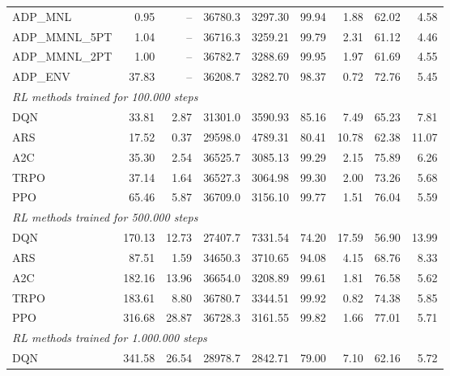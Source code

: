\begin{samepage}
\begin{center}
\begin{tabular}{l|rr|rr|rr|rr}
    \midrule
    ADP\_MNL     &     0.95 &    -- &    36780.3 &    3297.30 &   99.94 &    1.88 &   62.02 &    4.58 \\
    ADP\_MMNL\_5PT &     1.04 &    -- &    36716.3 &    3259.21 &   99.79 &    2.31 &   61.12 &    4.46 \\
    ADP\_MMNL\_2PT &     1.00 &    -- &    36782.7 &    3288.69 &   99.95 &    1.97 &   61.69 &    4.55 \\
    ADP\_ENV     &    37.83 &    -- &    36208.7 &    3282.70 &   98.37 &    0.72 &   72.76 &    5.45 \\
    \midrule
    \multicolumn{9}{l}{\textit{RL methods trained for 100.000 steps}} \\
    \midrule
    DQN          &    33.81 &     2.87 &    31301.0 &    3590.93 &   85.16 &    7.49 &   65.23 &    7.81 \\
    ARS          &    17.52 &     0.37 &    29598.0 &    4789.31 &   80.41 &   10.78 &   62.38 &   11.07 \\
    A2C          &    35.30 &     2.54 &    36525.7 &    3085.13 &   99.29 &    2.15 &   75.89 &    6.26 \\
    TRPO         &    37.14 &     1.64 &    36527.3 &    3064.98 &   99.30 &    2.00 &   73.26 &    5.68 \\
    PPO          &    65.46 &     5.87 &    36709.0 &    3156.10 &   99.77 &    1.51 &   76.04 &    5.59 \\
    \midrule
    \multicolumn{9}{l}{\textit{RL methods trained for 500.000 steps}} \\
    \midrule
    DQN          &   170.13 &    12.73 &    27407.7 &    7331.54 &   74.20 &   17.59 &   56.90 &   13.99 \\
    ARS          &    87.51 &     1.59 &    34650.3 &    3710.65 &   94.08 &    4.15 &   68.76 &    8.33 \\
    A2C          &   182.16 &    13.96 &    36654.0 &    3208.89 &   99.61 &    1.81 &   76.58 &    5.62 \\
    TRPO         &   183.61 &     8.80 &    36780.7 &    3344.51 &   99.92 &    0.82 &   74.38 &    5.85 \\
    PPO          &   316.68 &    28.87 &    36728.3 &    3161.55 &   99.82 &    1.66 &   77.01 &    5.71 \\
    \midrule
    \multicolumn{9}{l}{\textit{RL methods trained for 1.000.000 steps}} \\
    \midrule
    DQN          &   341.58 &    26.54 &    28978.7 &    2842.71 &   79.00 &    7.10 &   62.16 &    5.72 \\

\end{tabular}
\end{center}
\end{samepage}
